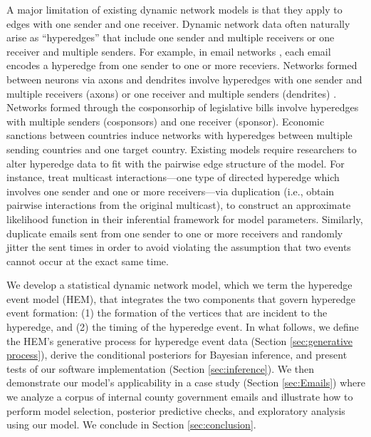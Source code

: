 \documentclass[ba]{imsart}
\numberwithin{equation}{section}
\theoremstyle{plain}
\begin{document}
	A major limitation of existing dynamic network models is that they apply to edges with one sender and one receiver. Dynamic network data often naturally arise as ``hyperedges'' \citep{karypis1999multilevel,ghoshal2009random,zlatic2009hypergraph,zhang2010hypergraph} that include one sender and multiple receivers or one receiver and multiple senders. For example, in email networks \citep{newman2002email}, each email encodes a hyperedge from one sender to one or more receviers. Networks formed between neurons via axons and dendrites involve hyperedges with one sender and multiple receivers (axons) or one receiver and multiple senders (dendrites) \citep{partzsch2012developing}. Networks formed through the cosponsorhip of legislative bills \citep{fowler2006legislative} involve hyperedges with multiple senders (cosponsors) and one receiver (sponsor). Economic sanctions between countries \citep{cranmer2014reciprocity} induce networks with hyperedges between multiple sending countries and one target country. Existing models require researchers to alter hyperedge data to fit with the pairwise edge structure of the model. For instance, \cite{PerryWolfe2012} treat multicast interactions---one type of directed hyperedge which involves one sender and one or more receivers---via duplication (i.e., obtain pairwise interactions from the original multicast), to construct an approximate likelihood function in their inferential framework for model parameters. Similarly, \cite{fan2009learning} duplicate emails sent from one sender to one or more receivers and randomly jitter the sent times in order to avoid violating the assumption that two events cannot occur at the exact same time. %
	
	We develop a statistical dynamic network model, which we term the hyperedge event model (HEM), that integrates the two components that govern hyperedge event formation: (1) the formation of the vertices that are incident to the hyperedge, and (2) the timing of the hyperedge event. In what follows, we define the HEM's generative process for hyperedge event data (Section \ref{sec:generative process}), derive the conditional posteriors for Bayesian inference, and present tests of our software implementation (Section \ref{sec:inference}). We then demonstrate our model's applicability in a case study (Section \ref{sec:Emails}) where we analyze a corpus of internal county government emails and illustrate how to perform model selection, posterior predictive checks, and exploratory analysis using our model. We conclude in Section \ref{sec:conclusion}.~
	
\end{document}

